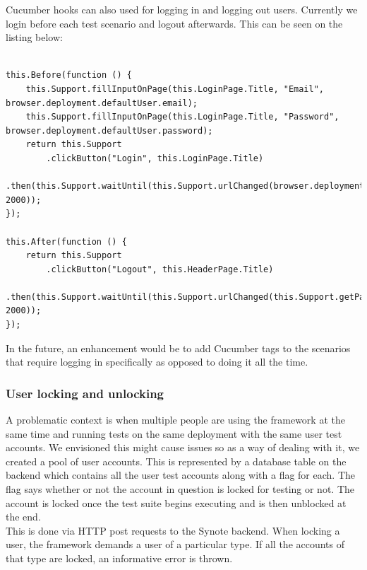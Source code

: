 Cucumber hooks can also used for logging in and logging out users. Currently we login before each test scenario and logout afterwards. This can be seen on the listing below:

\begin{listing}[H]
\begin{verbatim}

this.Before(function () {
	this.Support.fillInputOnPage(this.LoginPage.Title, "Email", browser.deployment.defaultUser.email);
    this.Support.fillInputOnPage(this.LoginPage.Title, "Password", browser.deployment.defaultUser.password);
    return this.Support
    	.clickButton("Login", this.LoginPage.Title)
		.then(this.Support.waitUntil(this.Support.urlChanged(browser.deployment.hostUrl), 2000)); 
});

this.After(function () {
	return this.Support
		.clickButton("Logout", this.HeaderPage.Title)
		.then(this.Support.waitUntil(this.Support.urlChanged(this.Support.getPageUrl(this.LoginPage.Title)), 2000));
});

\end{verbatim}
\label{lst:login-and-logout-hooks}
\end{listing}

In the future, an enhancement would be to add Cucumber tags to the scenarios that require logging in specifically as opposed to doing it all the time.

\subsubsection{User locking and unlocking}
\label{subsubsec:user-locking-and-unlocking}

A problematic context is when multiple people are using the framework at the same time and running tests on the same deployment with the same user test accounts. We envisioned this might cause issues so as a way of dealing with it, we created a pool of user accounts. This is represented by a database table on the backend which contains all the user test accounts along with a flag for each. The flag says whether or not the account in question is locked for testing or not. The account is locked once the test suite begins executing and is then unblocked at the end.
\\

This is done via HTTP post requests to the Synote backend. When locking a user, the framework demands a user of a particular type. If all the accounts of that type are locked, an informative error is thrown.
\\

